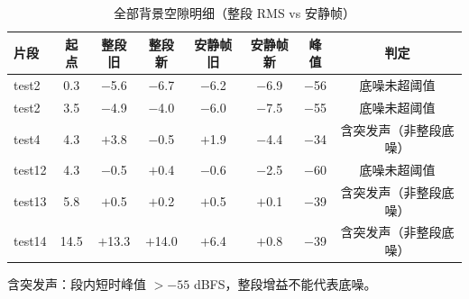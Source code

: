 \begin{table}[htbp]\centering
\caption{全部背景空隙明细（整段 RMS vs 安静帧）}\label{tab:nm_bg_detail}
{\footnotesize\begin{threeparttable}
\begin{tabular}{lccccccc}\toprule
片段 & 起点 & 整段旧 & 整段新 & 安静帧旧 & 安静帧新 & 峰值 & 判定 \\
\midrule
test2 & 0.3 & $-$5.6 & $-$6.7 & $-$6.2 & $-$6.9 & $-$56 & 底噪未超阈值 \\
test2 & 3.5 & $-$4.9 & $-$4.0 & $-$6.0 & $-$7.5 & $-$55 & 底噪未超阈值 \\
test4 & 4.3 & $+$3.8 & $-$0.5 & $+$1.9 & $-$4.4 & $-$34 & 含突发声（非整段底噪） \\
test12 & 4.3 & $-$0.5 & $+$0.4 & $-$0.6 & $-$2.5 & $-$60 & 底噪未超阈值 \\
test13 & 5.8 & $+$0.5 & $+$0.2 & $+$0.5 & $+$0.1 & $-$39 & 含突发声（非整段底噪） \\
test14 & 14.5 & $+$13.3 & $+$14.0 & $+$6.4 & $+$0.8 & $-$39 & 含突发声（非整段底噪） \\
\bottomrule\end{tabular}
\begin{tablenotes}\footnotesize\item 含突发声：段内短时峰值 $>-55$ dBFS，整段增益不能代表底噪。\end{tablenotes}\end{threeparttable}}
\end{table}
